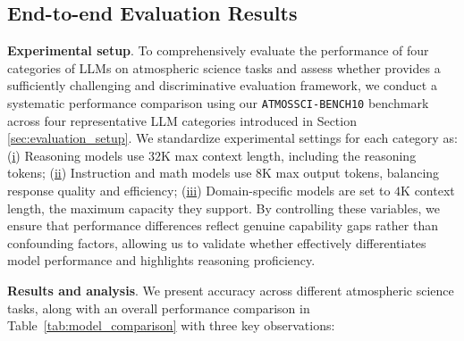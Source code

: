 

\subsection{End-to-end Evaluation Results}

\textbf{Experimental setup}. 
To comprehensively evaluate the performance of four categories of LLMs on atmospheric science tasks and assess whether \name provides a sufficiently challenging and discriminative evaluation framework, we conduct a systematic performance comparison using our \texttt{ATMOSSCI-BENCH10} benchmark across four representative LLM categories introduced in Section \ref{sec:evaluation_setup}. We standardize experimental settings for each category as:
(\underline{i}) Reasoning models use $32$K max context length, including the reasoning tokens;
(\underline{ii}) Instruction and math models use $8$K max output tokens, balancing response quality and efficiency;
(\underline{iii}) Domain-specific models are set to $4$K context length, the maximum capacity they support.
By controlling these variables, we ensure that performance differences reflect genuine capability gaps rather than confounding factors, allowing us to validate whether \name effectively differentiates model performance and highlights reasoning proficiency.


\textbf{Results and analysis}. 
We present accuracy across different atmospheric science tasks, along with an overall performance comparison in Table~\ref{tab:model_comparison} with three key observations:







